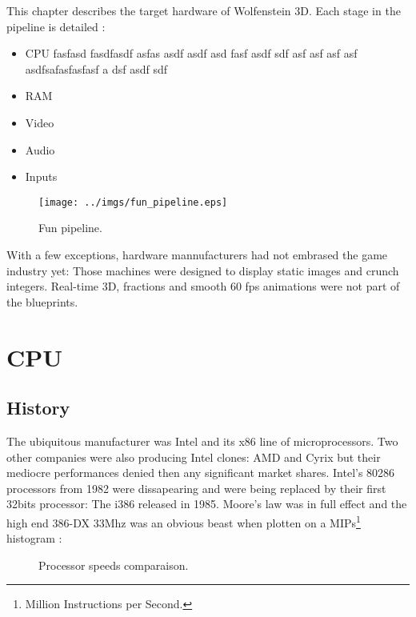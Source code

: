 \documentclass[book.tex]{subfiles}
\begin{document}
This chapter describes the target hardware of Wolfenstein 3D. Each stage in the pipeline is detailed :
\begin{itemize} 
  \item CPU fasfasd fasdfasdf asfas asdf asdf asd fasf asdf sdf asf asf asf asf asdfsafasfasfasf a dsf asdf sdf 
  \item RAM
  \item Video
  \item Audio
  \item Inputs
\end{itemize}

\begin{figure}[!htb]
\centering
\texttt{[image: ../imgs/fun\_pipeline.eps]}
\caption{Fun pipeline.}
\label{fig:digraph}
\end{figure}
           

With a few exceptions, hardware mannufacturers had not embrased the game industry yet: Those machines were designed to display static images and crunch integers. Real-time 3D, fractions and smooth 60 fps animations were not part of the blueprints.

\section{CPU}
  \subsection{History}
  The ubiquitous manufacturer was Intel and its x86 line of microprocessors. Two other companies were also producing Intel clones: AMD and Cyrix but their mediocre performances denied then any significant market shares. Intel's 80286 processors from 1982 were dissapearing and were being replaced by their first 32bits processor: The i386 released in 1985. Moore's law was in full effect and the high end 386-DX 33Mhz was an obvious beast when plotten on a MIPs\footnote{Million Instructions per Second.} histogram  :



\begin{figure}[!htb]
\centering
   \caption{Processor speeds comparaison.} \label{fig:mips}
 \end{figure}
\end{document}
